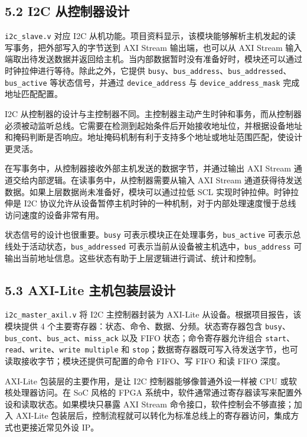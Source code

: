 \subsection{5.2 I2C 从控制器设计}\label{i2c-ux4eceux63a7ux5236ux5668ux8bbeux8ba1}

\texttt{i2c\_slave.v} 对应 I2C 从机功能。项目资料显示，该模块能够解析主机发起的读写事务，把外部写入的字节送到 AXI Stream 输出端，也可以从 AXI Stream 输入端取出待发送数据并返回给主机。当内部数据暂时没有准备好时，模块还可以通过时钟拉伸进行等待。除此之外，它提供 \texttt{busy}、\texttt{bus\_address}、\texttt{bus\_addressed}、\texttt{bus\_active} 等状态信号，并通过 \texttt{device\_address} 与 \texttt{device\_address\_mask} 完成地址匹配配置。

I2C 从控制器的设计与主控制器不同。主控制器主动产生时钟和事务，而从控制器必须被动监听总线。它需要在检测到起始条件后开始接收地址位，并根据设备地址和掩码判断是否响应。地址掩码机制有利于支持多个地址或地址范围匹配，使设计更灵活。

在写事务中，从控制器接收外部主机发送的数据字节，并通过输出 AXI Stream 通道交给内部逻辑。在读事务中，从控制器需要从输入 AXI Stream 通道获得待发送数据。如果上层数据尚未准备好，模块可以通过拉低 SCL 实现时钟拉伸。时钟拉伸是 I2C 协议允许从设备暂停主机时钟的一种机制，对于内部处理速度慢于总线访问速度的设备非常有用。

状态信号的设计也很重要。\texttt{busy} 可表示模块正在处理事务，\texttt{bus\_active} 可表示总线处于活动状态，\texttt{bus\_addressed} 可表示当前从设备被主机选中，\texttt{bus\_address} 可输出当前地址信息。这些状态有助于上层逻辑进行调试、统计和控制。

\subsection{5.3 AXI-Lite 主机包装层设计}\label{axi-lite-ux4e3bux673aux5305ux88c5ux5c42ux8bbeux8ba1}

\texttt{i2c\_master\_axil.v} 将 I2C 主控制器封装为 AXI-Lite 从设备。根据项目报告，该模块提供 4 个主要寄存器：状态、命令、数据、分频。状态寄存器包含 \texttt{busy}、\texttt{bus\_cont}、\texttt{bus\_act}、\texttt{miss\_ack} 以及 FIFO 状态；命令寄存器允许组合 \texttt{start}、\texttt{read}、\texttt{write}、\texttt{write\ multiple} 和 \texttt{stop}；数据寄存器既可写入待发送字节，也可读取接收字节；模块还提供可配置的命令 FIFO、写 FIFO 和读 FIFO 深度。

AXI-Lite 包装层的主要作用，是让 I2C 控制器能够像普通外设一样被 CPU 或软核处理器访问。在 SoC 风格的 FPGA 系统中，软件通常通过寄存器读写来配置外设和读取状态。如果模块只暴露 AXI Stream 命令接口，软件控制会不够直接；加入 AXI-Lite 包装层后，控制流程就可以转化为标准总线上的寄存器访问，集成方式也更接近常见外设 IP。

